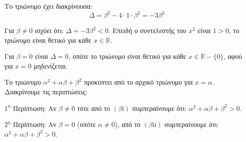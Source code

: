 
\begin{alist}
\item Το τριώνυμο έχει διακρίνουσα:
\[\Delta = \beta^2 - 4 \cdot 1 \cdot \beta^2 = -3\beta^2\]

\item 
\begin{rlist}
\item Για $\beta \ne 0$ ισχύει ότι:
$\Delta = -3\beta^2 < 0$.
Επειδή ο συντελεστής του $x^2$ είναι $1 > 0$, το τριώνυμο είναι θετικό για κάθε $x \in \mathbb{R}$.

\item Για $\beta = 0$ είναι $\Delta = 0$, οπότε το τριώνυμο είναι θετικό για κάθε $x \in \mathbb{R} - \{0\}$, αφού
για $x = 0$ μηδενίζεται.
\end{rlist}

\item Το τριώνυμο $\alpha^2 + \alpha\beta + \beta^2$ προκύπτει από το αρχικό τριώνυμο για $x = \alpha$. Διακρίνουμε τις
περιπτώσεις:

$1^\text{η}$ Περίπτωση:
Αν $\beta \ne 0$ τότε από το $(\beta \text{i})$ συμπεραίνουμε ότι:
$\alpha^2 + \alpha\beta + \beta^2 > 0$.

$2^\text{η}$ Περίπτωση:
Αν $\beta = 0$ (οπότε $\alpha \ne 0$), από το $(\beta \text{ii})$ συμπεραίνουμε ότι:
$\alpha^2 + \alpha\beta + \beta^2 > 0$.
\end{alist}

